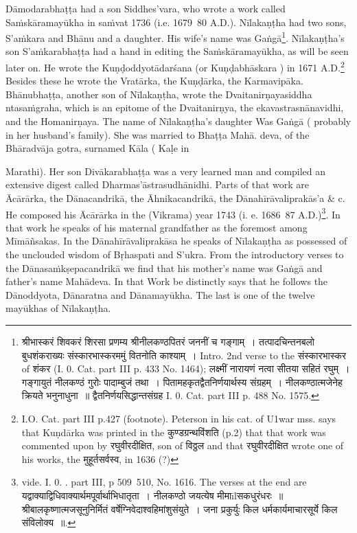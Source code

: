 \documentclass[11pt, openany]{book}
\begin{document}
Dāmodarabhaṭṭa had a son Siddhes'vara, who wrote a work called Saṁskāramayūkha in saṁvat 1736 (i.e. 1679\textendash\ 80 A.D.). Nīlakaṇṭha had two sons, S'aṁkara and Bhānu and a daughter. His wife's name was Gaṅgā\renewcommand{\thefootnote}{2}\footnote{श्रीभास्करं शिवकरं शिरसा प्रणम्य श्रीनीलकण्ठपितरं जननीं च गङ्गाम्~। तत्पादचिन्तनबलो बुधशंकराख्यः संस्कारभास्करममुं वितनोति काश्याम्~। Intro. 2nd verse to the संस्कारभास्कर of शंकर (I. 0. Cat. part III p. 433 No. 1464); लक्ष्मीं नारायणं नत्वा सीतया सहितं रघुम्~। गङ्गायुतं नीलकण्ठं गुरोः पादाम्बुजं तथा~। पितामहकृतद्वैतनिर्णयार्थस्य संग्रहम्~। नीलकण्ठात्मजेनेह क्रियते भनुनाधुना~॥ द्वैतनिर्णयसिद्धान्तसंग्रह I. 0. Cat. part III p. 488 No. 1575.}. Nīlakaṇṭha's son S'aṁkarabhaṭṭa had a hand in editing the Saṁskāramayūkha, as will be seen later on. He wrote the Kuṇḍoddyotādarśana (or Kuṇḍabhāskara ) in 1671 A.D.\renewcommand{\thefootnote}{3}\footnote{I.O. Cat. part III p.427 (footnote). Peterson in his cat. of U1war mss. says that Kuṇdārka was printed in the कुण्डग्रन्थविंशति (p.2) that that work was commented upon by रघुवीरदीक्षित, son of विठ्ठल and that रघुवीरदीक्षित wrote one of his works, the मुहूर्तसर्वस्व, in 1636 (?)} Besides these he wrote the Vratārka, the Kuṇḍārka, the Karmavipāka. Bhānubhaṭṭa, another son of Nīlakaṇṭha, wrote the Dvaitanirṇayasiddha ntasaṁgraha, which is an epitome of the Dvaitanirṇya, the ekavastrasnānavidhi, and the Homanirṇaya. The name of Nīlakaṇṭha's daughter Was Gaṅgā ( probably in her husband's family). She was married to Bhaṭṭa Mahā. deva, of the Bhāradvāja gotra, surnamed Kāla ( Kaḷe in

\newpage

\noindent
Marathi). Her son Divākarabhaṭṭa was a very learned man and compiled an extensive digest called Dharmas'āstrasudhānidhi. Parts of that work are Ācārārka, the Dānacandrikā, the Āhnikacandrikā, the Dānahīrāvaliprakās'a \& c. He composed his Ācārārka in the (Vikrama) year 1743 (i. e. 1686\textendash\ 87 A.D.)\renewcommand{\thefootnote}{1}\footnote{vide. I. 0. . part III, p 509\textendash\ 510, No. 1616. The verses at the end are {\qt यद्वाक्याद्विधिवाक्यार्थमपूर्वार्थाभिधातृता~। नीलकण्ठो जयत्येष मीमाīlसकधुरंधरः~॥ श्रीबालकृष्णात्मजसूनुनिर्मितं वर्षेग्निवेदाश्वहिमांशुसंयुते~। जना प्रकुर्युः किल धर्मकार्यमाचारसूर्ये किल संविलोक्य~॥}.}. In that work he speaks of his maternal grandfather as the foremost among Mīmāñsakas. In the Dānahīrāvaliprakāsa he speaks of Nīlakaṇṭha as possessed of the unclouded wisdom of Bṛhaspati and S'ukra. From the introductory verses to the Dānasaṁkṣepacandrikā we find that his mother's name was Gaṅgā and father's name Mahādeva. In that Work be distinctly says that he follows the Dānoddyota, Dānaratna and Dānamayūkha. The last is one of the twelve mayūkhas of Nīlakaṇṭha.
\end{document}
